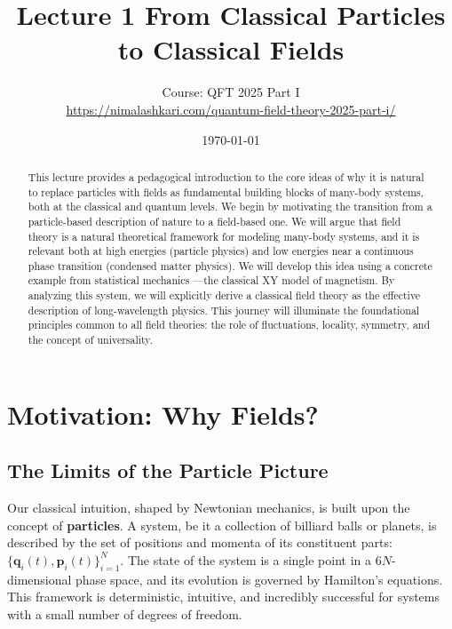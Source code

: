 \documentclass[11pt, a4paper, article]{article}
\title{Lecture 1 From Classical Particles to Classical Fields}
\author{Course: QFT 2025 Part I \\ \small{\url{https://nimalashkari.com/quantum-field-theory-2025-part-i/}}}
\date{\today}
\renewcommand{\vec}[1]{\bm{#1}} %
\begin{document}
\maketitle
\thispagestyle{fancy}

\begin{abstract}
\noindent This lecture provides a pedagogical introduction to the core ideas of why it is natural to replace particles with fields as fundamental building blocks of many-body systems, both at the classical and quantum levels. We begin by motivating the transition from a particle-based description of nature to a field-based one. We will argue that field theory is a natural theoretical framework for modeling many-body systems, and it is relevant both at high energies (particle physics) and low energies near a continuous phase transition (condensed matter physics). We will develop this idea using a concrete example from statistical mechanics —the classical XY model of magnetism. By analyzing this system, we will explicitly derive a classical field theory as the effective description of long-wavelength physics. This journey will illuminate the foundational principles common to all field theories: the role of fluctuations, locality, symmetry, and the concept of universality.
\end{abstract}

\newpage
\tableofcontents
\newpage

\section{Motivation: Why Fields?}

\subsection{The Limits of the Particle Picture}
Our classical intuition, shaped by Newtonian mechanics, is built upon the concept of \textbf{particles}. A system, be it a collection of billiard balls or planets, is described by the set of positions and momenta of its constituent parts: $\{ \vec{q}_i(t), \vec{p}_i(t) \}_{i=1}^N$. The state of the system is a single point in a $6N$-dimensional phase space, and its evolution is governed by Hamilton's equations. This framework is deterministic, intuitive, and incredibly successful for systems with a small number of degrees of freedom.
\end{document}
